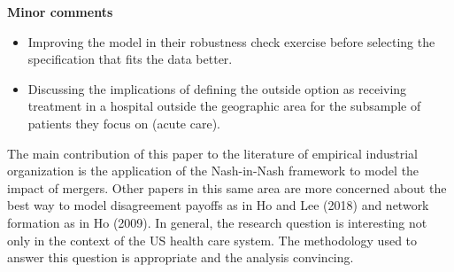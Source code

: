 \documentclass[12pt,english]{article}
\begin{document}
\textbf{Minor comments}
\begin{itemize}
\item Improving the model in their robustness check exercise before selecting the specification that fits the data better.
\item Discussing the implications of defining the outside option as receiving treatment in a hospital outside the geographic area for the subsample of patients they focus on (acute care).
\end{itemize}
The main contribution of this paper to the literature of empirical industrial organization is the application of the Nash-in-Nash framework to model the impact of mergers. Other papers in this same area are more concerned about the best way to model disagreement payoffs as in Ho and Lee (2018) and network formation as in Ho (2009). In general, the research question is interesting not only in the context of the US health care system. The methodology used to answer this question is appropriate and the analysis convincing. 
\end{document}
